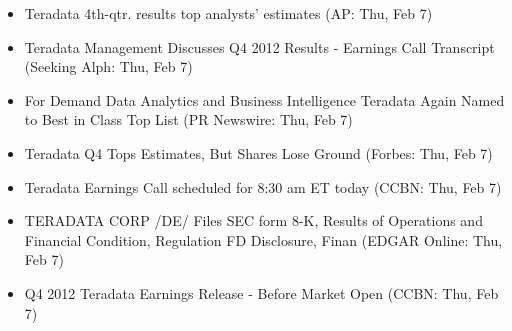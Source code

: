 \documentclass[11pt,asymmetric]{article}
\begin{document}
\begin{itemize}
\item Teradata 4th-qtr. results top analysts' estimates (AP: Thu, Feb 7)
\item Teradata Management Discusses Q4 2012 Results - Earnings Call Transcript (Seeking Alph: Thu, Feb 7)
\item For Demand Data Analytics and Business Intelligence Teradata Again Named to Best in Class Top List (PR Newswire: Thu, Feb 7)
\item Teradata Q4 Tops Estimates, But Shares Lose Ground (Forbes: Thu, Feb 7)
\item Teradata Earnings Call scheduled for 8:30 am ET today (CCBN: Thu, Feb 7)
\item TERADATA CORP /DE/ Files SEC form 8-K, Results of Operations and Financial Condition, Regulation FD Disclosure, Finan (EDGAR Online: Thu, Feb 7)
\item Q4 2012 Teradata Earnings Release - Before Market Open (CCBN: Thu, Feb 7)
\end{itemize}
\end{document}
